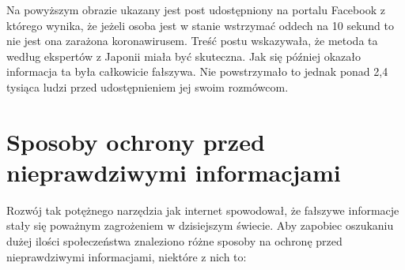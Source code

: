 Na powyższym obrazie ukazany jest post udostępniony na portalu Facebook z którego wynika, że jeżeli osoba jest w stanie wstrzymać 
oddech na 10 sekund to nie jest ona zarażona koronawirusem. Treść postu wskazywała, że metoda ta według ekspertów 
z Japonii miała być skuteczna. Jak się później okazało informacja ta była całkowicie fałszywa. Nie powstrzymało to jednak ponad 2,4 tysiąca ludzi przed 
udostępnieniem jej swoim rozmówcom.~\cite{KoronaOddech} 

\section{Sposoby ochrony przed nieprawdziwymi informacjami}
Rozwój tak potężnego narzędzia jak internet spowodował, że fałszywe informacje
stały się poważnym zagrożeniem w dzisiejszym świecie. Aby zapobiec oszukaniu 
dużej ilości społeczeństwa znaleziono różne sposoby na ochronę przed nieprawdziwymi
informacjami, niektóre z nich to: 
